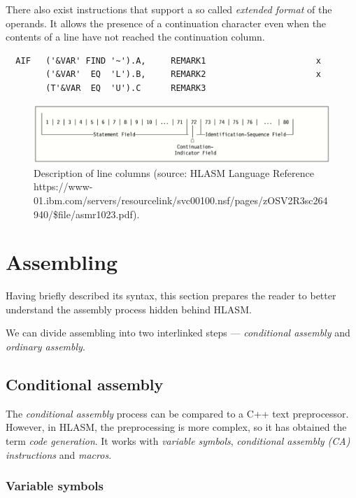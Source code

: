 There also exist instructions that support a so called \textit{extended format} of the operands. It allows the presence of a continuation character even when the contents of a line have not reached the continuation column. 
\begin{verbatim}
  AIF   ('&VAR' FIND '~').A,     REMARK1                      x
        ('&VAR'  EQ  'L').B,     REMARK2                      x
        (T'&VAR  EQ  'U').C      REMARK3 
\end{verbatim} 

\begin{figure}
	\includegraphics[width=\textwidth]{img/line}
	\caption{Description of line columns (source: HLASM Language Reference https://www-01.ibm.com/servers/resourcelink/\-svc00100.nsf/\-pages/\-zOSV2R3sc264940/\-\$file/\-asmr1023.pdf).}
	\label{fig01:line}
\end{figure}


\section{Assembling}

Having briefly described its syntax, this section prepares the reader to better understand the assembly process hidden behind HLASM. 

We can divide assembling into two interlinked steps --- \emph{conditional assembly} and \emph{ordinary assembly}.

\subsection{Conditional assembly}

The \emph{conditional assembly} process can be compared to a C++ text preprocessor. However, in HLASM, the preprocessing is more complex, so it has obtained the term \textit{code generation}. It works with \emph{variable symbols}, \emph{conditional assembly (CA) instructions} and \emph{macros}. 

\subsubsection{Variable symbols}

